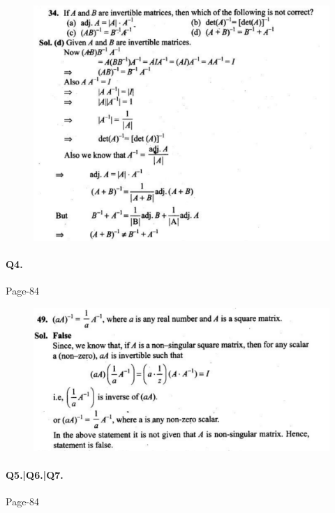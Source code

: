 \documentclass{article}
\begin{document}
\begin{figure}[H]
    \includegraphics[scale=0.5]{determinants_l3_ps_9.png}
\end{figure}


\clearpage
\paragraph{Q4.}
\begin{flushright}
Page-84
\end{flushright}

\begin{figure}[H]
    \includegraphics[scale=0.5]{determinants_l3_ps_5.png}
\end{figure}

\clearpage
\paragraph{Q5.|Q6.|Q7.}
\begin{flushright}
Page-84
\end{flushright}
\end{document}
